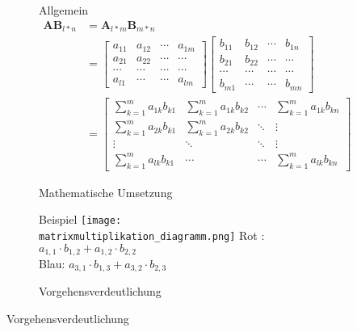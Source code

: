 \documentclass[12pt]{report}
\begin{document}
	\begin{figure}[h]
		\centering
		\begin{subfigure}{.5\textwidth}
		\centering
		Allgemein
  		\begin{align*}
  			\textbf{AB}_{l*n} &= \textbf{A}_{l*m}\textbf{B}_{m*n} \\  			
  			&= \left[ \begin{smallmatrix}
  			a_{11} & a_{12} & \cdots & a_{1m}\\ a_{21} & a_{22} & \cdots & \cdots \\ \cdots & \cdots & \cdots & \cdots\\ a_{l1} & \cdots & \cdots & a_{lm} \end{smallmatrix} \right] \left[ \begin{smallmatrix} 
  			 b_{11} & b_{12} & \cdots & b_{1n}\\ b_{21} & b_{22} & \cdots & \cdots\\ \cdots & \cdots & \cdots & \cdots \\ b_{m1} & \cdots & \cdots & b_{mn} \end{smallmatrix} \right]\\
  			 &= \begin{bmatrix}
  			 \displaystyle\sum_{k=1}^{m} a_{1k}b_{k1} & \displaystyle\sum_{k=1}^{m} a_{1k}b_{k2} & \cdots & \displaystyle\sum_{k=1}^{m} a_{1k}b_{kn} \\
  			 \displaystyle\sum_{k=1}^{m} a_{2k}b_{k1} & \displaystyle\sum_{k=1}^{m} a_{2k}b_{k2} & \ddots & \vdots \\
  			 \vdots & \ddots & \ddots & \vdots \\
  			 \displaystyle\sum_{k=1}^{m} a_{lk}b_{k1} & \cdots & \cdots & \displaystyle\sum_{k=1}^{m} a_{lk}b_{kn} 
  			 \end{bmatrix} \hspace{1cm}
  		\end{align*}
  		\caption{Mathematische Umsetzung}
		\end{subfigure}
		\begin{subfigure}{.3\textwidth}
  		\centering
  		Beispiel
  		\vspace{0.2cm}
 	 	\texttt{[image: matrixmultiplikation\_diagramm.png]}
 	 	\centering
 	 	Rot : $a_{1,1} \cdot b_{1,2} + a_{1,2} \cdot b_{2,2}$\\
 	 	Blau: $a_{3,1} \cdot b_{1,3} + a_{3,2} \cdot b_{2,3}$
 	 	\vspace{1.5cm}
 	 	\caption{Vorgehensverdeutlichung\protect\footnotemark}
		\end{subfigure}
	\end{figure}
\end{document}
